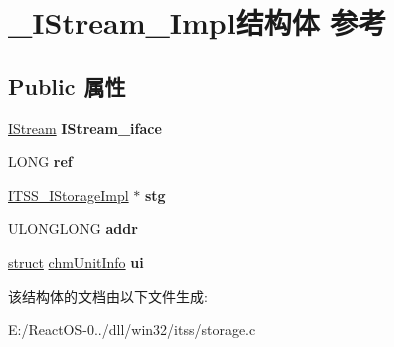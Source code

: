 \hypertarget{struct___i_stream___impl}{}\section{\+\_\+\+I\+Stream\+\_\+\+Impl结构体 参考}
\label{struct___i_stream___impl}
\subsection*{Public 属性}
\begin{DoxyCompactItemize}
\item 
\mbox{\label{struct___i_stream___impl_a02df498cecfe91e52d4827c4b6c4b451}} 
\hyperlink{interface_i_stream}{I\+Stream} {\bfseries I\+Stream\+\_\+iface}
\item 
\mbox{\label{struct___i_stream___impl_adfe8ac9fd5d251aebbef8e179b4d6049}} 
L\+O\+NG {\bfseries ref}
\item 
\mbox{\label{struct___i_stream___impl_a723a1a427df68224825cbb92f97b2582}} 
\hyperlink{struct___i_t_s_s___i_storage_impl}{I\+T\+S\+S\+\_\+\+I\+Storage\+Impl} $\ast$ {\bfseries stg}
\item 
\mbox{\label{struct___i_stream___impl_a8da5316f6b7a124886c3ea4d8d379328}} 
U\+L\+O\+N\+G\+L\+O\+NG {\bfseries addr}
\item 
\mbox{\label{struct___i_stream___impl_a5c15f68a84a618dec63cf083aa1999f7}} 
\hyperlink{interfacestruct}{struct} \hyperlink{structchm_unit_info}{chm\+Unit\+Info} {\bfseries ui}
\end{DoxyCompactItemize}


该结构体的文档由以下文件生成\+:\begin{DoxyCompactItemize}
\item 
E\+:/\+React\+O\+S-\/0../dll/win32/itss/storage.\+c\end{DoxyCompactItemize}
